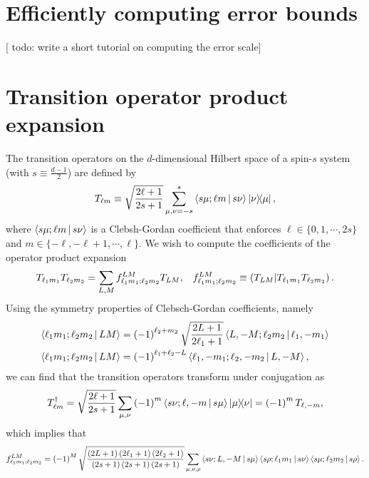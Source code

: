 \documentclass[notitlepage,twocolumn]{revtex4-2}
\newcommand{\f}[2]{\dfrac{#1}{#2}} %
\newcommand{\p}[1]{\left(#1\right)} %
\newcommand{\bk}{\Braket} %
\renewcommand{\set}[1]{\{#1\}} %
\def\obk#1{\mathinner{({#1})}}
\newcommand{\red}[1]{{\color{red} #1}}
\begin{document}
\section{Efficiently computing error bounds}
\label{sec:compute}

[\red{todo: write a short tutorial on computing the error scale}]

\section{Transition operator product expansion}
\label{sec:trans_prod}

The transition operators on the $d$-dimensional Hilbert space of a spin-$s$ system (with $s\equiv\frac{d-1}{2}$) are defined by
\begin{align}
  T_{\ell m} \equiv \sqrt{\f{2\ell+1}{2s+1}} \sum_{\mu,\nu=-s}^s
  \bk{s\mu;\ell m|s\nu} \op{\nu}{\mu},
\end{align}
where $\bk{s\mu;\ell m|s\nu}$ is a Clebsh-Gordan coefficient that enforces $\ell\in\set{0,1,\cdots,2s}$ and $m\in\set{-\ell,-\ell+1,\cdots,\ell}$.
We wish to compute the coefficients of the operator product expansion
\begin{align}
  T_{\ell_1 m_1} T_{\ell_2 m_2}
  = \sum_{L,M} f_{\ell_1 m_1;\ell_2 m_2}^{LM} T_{LM},
  &&
  f_{\ell_1 m_1;\ell_2 m_2}^{LM}
  \equiv \obk{T_{LM} | T_{\ell_1 m_1} T_{\ell_2 m_2}}.
\end{align}
Using the symmetry properties of Clebsch-Gordan coefficients, namely
\begin{align}
  \bk{\ell_1 m_1; \ell_2 m_2| L M}
  &= \p{-1}^{\ell_2+m_2} \sqrt{\f{2L+1}{2\ell_1+1}}
  \bk{L,-M; \ell_2 m_2| \ell_1,-m_1} \\
  \bk{\ell_1 m_1; \ell_2 m_2| L M}
  &= \p{-1}^{\ell_1+\ell_2-L}
  \bk{\ell_1,-m_1; \ell_2,-m_2| L,-M},
\end{align}
we can find that the transition operators transform under conjugation as
\begin{align}
  T_{\ell m}^\dag
  = \sqrt{\f{2\ell+1}{2s+1}}
  \sum_{\mu,\nu} \p{-1}^m \bk{s\nu;\ell,-m|s\mu} \op{\mu}{\nu}
  = \p{-1}^m T_{\ell,-m},
\end{align}
which implies that
\begin{align}
  f_{\ell_1 m_1;\ell_2 m_2}^{LM}
  = \p{-1}^M \sqrt{\f{\p{2L+1}\p{2\ell_1+1}\p{2\ell_2+1}}
    {\p{2s+1}\p{2s+1}\p{2s+1}}}
  \sum_{\mu,\nu,\rho} \bk{s\nu;L,-M|s\mu}
  \bk{s\rho;\ell_1m_1|s\nu} \bk{s\mu;\ell_2m_2|s\rho}.
\end{align}
\end{document}
